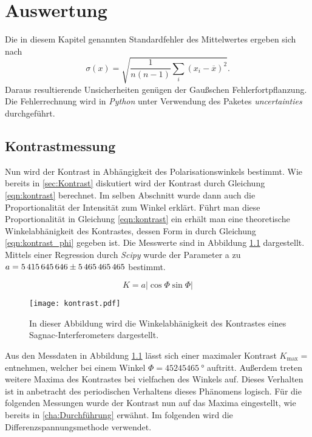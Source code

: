 \chapter{Auswertung}
\label{cha:Auswertung}
Die in diesem Kapitel genannten Standardfehler des Mittelwertes ergeben sich nach
\begin{equation*}
  \label{eqn:MW-Fehler}
  \sigma(x) = \sqrt{\frac{1}{n(n-1)} \sum_i (x_i - \overline{x})^2}.
\end{equation*}
Daraus resultierende Unsicherheiten genügen der Gaußschen Fehlerfortpflanzung.
Die Fehlerrechnung wird in \textit{Python} unter Verwendung des Paketes \textit{uncertainties} \cite{uncertainties} durchgeführt.

\section{Kontrastmessung}
\label{sec:kontrastmessung}
Nun wird der Kontrast in Abhängigkeit des Polarisationswinkels bestimmt. Wie bereits in \autoref{sec:Kontrast} diskutiert wird der Kontrast durch Gleichung \ref{eqn:kontrast} berechnet.
Im selben Abschnitt wurde dann auch die Proportionalität der Intensität zum Winkel erklärt. Führt man diese Proportionalität in Gleichung \ref{eqn:kontrast} ein erhält man eine 
theoretische Winkelabhänigkeit des Kontrastes, dessen Form in durch Gleichung \ref{eqn:kontrast_phi} gegeben ist. Die Messwerte sind in Abbildung \ref{fig:kontrast} dargestellt. Mittels
einer Regression durch \textit{Scipy}\cite{scipy} wurde der Parameter a zu $a = \num{5415645646 \pm 5465465465}$ bestimmt. 

\begin{equation}
  \label{eqn:kontrast_phi}
  K = a\lvert \cos\Phi\sin\Phi\rvert  
\end{equation}
\begin{figure}
    \centering
    \texttt{[image: kontrast.pdf]}
    \caption{In dieser Abbildung wird die Winkelabhänigkeit des Kontrastes eines Sagnac-Interferometers dargestellt.}
    \label{fig:kontrast}
\end{figure}

Aus den Messdaten in Abbildung \ref{fig:kontrast} lässt sich einer maximaler Kontrast $K_\mathrm{max} = $ entnehmen, welcher bei einem Winkel $\Phi = \qty{45245465}{\degree}$ auftritt.
Außerdem treten weitere Maxima des Kontrastes bei vielfachen des Winkels auf. Dieses Verhalten ist in anbetracht des periodischen Verhaltens dieses Phänomens logisch. 
Für die folgenden Messungen wurde der Kontrast nun auf das Maxima eingestellt, wie bereits in \autoref{cha:Durchführung} erwähnt. Im folgenden wird die Differenzspannungsmethode 
verwendet.

